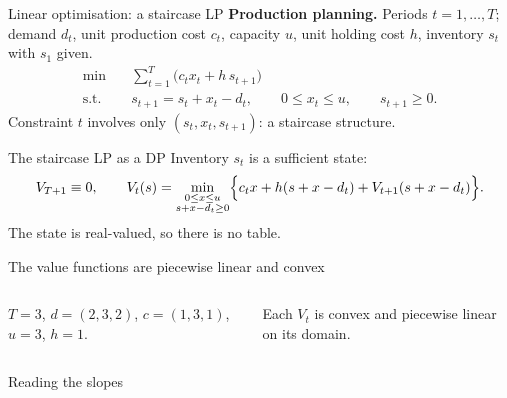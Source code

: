 \begin{frame}{Linear optimisation: a staircase LP}
	\textbf{Production planning.} Periods $t=1,\dots,T$; demand $d_t$, unit production cost $c_t$, capacity $u$,
	unit holding cost $h$, inventory $s_t$ with $s_1$ given.
	\begin{align*}
		\min\quad & \sum_{t=1}^{T}\bigl(c_tx_t+h\,s_{t+1}\bigr)\\
		\text{s.t.}\quad & s_{t+1}=s_t+x_t-d_t, \qquad 0\le x_t\le u, \qquad s_{t+1}\ge0.
	\end{align*}
	Constraint $t$ involves only $(s_t,x_t,s_{t+1})$: a \alert{staircase} structure.
\end{frame}

\begin{frame}{The staircase LP as a DP}
	Inventory $s_t$ is a sufficient state:
	\[
		V_{T+1}\equiv0,\qquad
		V_t(s)=\min_{\substack{0\le x\le u\\ s+x-d_t\ge0}}\Bigl\{c_tx+h(s+x-d_t)+V_{t+1}(s+x-d_t)\Bigr\}.
	\]
	The state is real-valued, so there is no table.
\end{frame}

\begin{frame}{The value functions are piecewise linear and convex}
	\begin{columns}[T,onlytextwidth]

		$T=3$, $d=(2,3,2)$, $c=(1,3,1)$, $u=3$, $h=1$.

		\begin{theorem}
			Each $V_t$ is convex and piecewise linear on its domain.
		\end{theorem}
	\end{columns}
\end{frame}

\begin{frame}{Reading the slopes}
\end{frame}

